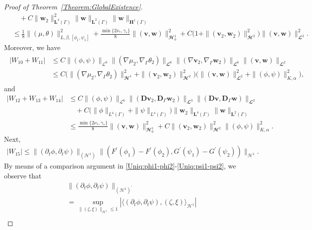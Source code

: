 \documentclass[10pt,reqno]{amsart}
\theoremstyle{remark}
\numberwithin{equation}{section}
\newcommand{\abs}[1]{| #1 |}
\newcommand{\norm}[1]{\| #1 \|}
\newcommand{\bv}{\mathbf{v}}
\newcommand{\bw}{\mathbf{w}}
\newcommand{\D}{\mathbf{D}}
\newcommand{\Dg}{\mathbf{D}_\Gamma}
\newcommand{\delt}{\partial_{t}}
\newcommand{\Grad}{\nabla}
\newcommand{\Gradg}{\nabla_\Ga}
\newcommand{\Ga}{\Gamma}
\begin{document}
\begin{proof}[Proof of Theorem~\ref{Theorem:GlobalExistence}]
\begin{align}
    &\quad + C\norm{\bw_2}_{\mathbf{L}^4(\Ga)}^2\norm{\bw}_{\mathbf{L}^2(\Ga)}\norm{\bw}_{\mathbf{H}^1(\Ga)} \\
    &\leq \frac18\norm{(\mu,\theta)}_{L,\beta,[\phi_1,\psi_1]}^2 + \frac{\min\{2\nu_\ast,\gamma_\ast\}}{8}\norm{(\bv,\bw)}_{\mathbfcal{H}^1_{0}}^2 + C\big(1 + \norm{(\bv_2,\bw_2)}_{\mathbfcal{H}^2}^2\big)\norm{(\bv,\bw)}_{\mathbfcal{L}^2}^2. \nonumber
\end{align}
Moreover, we have
\begin{align}\label{W1011}
    \begin{split}
    \abs{W_{10} + W_{11}} 
        &\leq C\norm{(\phi,\psi)}_{\mathcal{L}^6}\norm{(\Grad\mu_2,\Gradg\theta_2)}_{\mathbfcal{L}^6}\norm{(\Grad\bv_2,\Gradg\bw_2)}_{\mathbfcal{L}^6}\norm{(\bv,\bw)}_{\mathbfcal{L}^2} \\
        &\leq C\big(\norm{(\Grad\mu_2,\Gradg\theta_2)}_{\mathbfcal{H}^1}^2 + \norm{(\bv_2,\bw_2)}_{\mathbfcal{H}^2}^2\big)\big(\norm{(\bv,\bw)}_{\mathbfcal{L}^2}^2 + \norm{(\phi,\psi)}_{K,\alpha}^2\big),
    \end{split}
\end{align}
and
\begin{align}\label{W121314}
    \abs{W_{12}+ W_{13} + W_{14}} &\leq C\norm{(\phi,\psi)}_{\mathcal{L}^6}\norm{(\D\bv_2,\Dg\bw_2)}_{\mathbfcal{L}^3}\norm{(\D\bv,\Dg\bw)}_{\mathbfcal{L}^2} \nonumber\\
    &\quad + C\big(\norm{\phi}_{L^4(\Ga)} + \norm{\psi}_{L^4(\Ga)}\big)\norm{\bw_2}_{\mathbf{L}^4(\Ga)}\norm{\bw}_{\mathbf{L}^2(\Ga)} \\
    &\leq \frac{\min\{2\nu_\ast,\gamma_\ast\}}{8}\norm{(\bv,\bw)}_{\mathbfcal{H}^1_{0}}^2 + C\norm{(\bv_2,\bw_2)}_{\mathbfcal{H}^2}^2\norm{(\phi,\psi)}_{K,\alpha}^2. \nonumber
\end{align}
Next, 
\begin{align}\label{Uniq:Est:W15:1}
    \abs{W_{15}} \leq \norm{(\delt\phi,\delt\psi)}_{(\mathcal{H}^1)}\norm{(F^\prime(\phi_1) - F^\prime(\phi_2), G^\prime(\psi_1) - G^\prime(\psi_2))}_{\mathcal{H}^1}.
\end{align}
By means of a comparison argument in \eqref{Uniq:phi1-phi2}-\eqref{Uniq:psi1-psi2}, we observe that
\begin{align}\label{Uniq:Est:W15:delt}
    &\norm{(\delt\phi,\delt\psi)}_{(\mathcal{H}^1)^\prime} \nonumber \\
    &= \sup_{\norm{(\zeta,\xi)}_{\mathcal{H}^1}\leq 1} \abs{\langle (\delt\phi,\delt\psi), (\zeta,\xi)\rangle_{\mathcal{H}^1}} \\

\end{align}
\end{proof}
\end{document}
